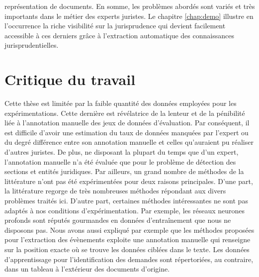 représentation de documents. En somme, les problèmes abordés sont variés et très importants dans le métier des experts juristes. Le chapitre \ref{chap:demo} illustre en l'occurrence la riche visibilité sur la jurisprudence qui devient facilement accessible à ces derniers grâce à l'extraction automatique des connaissances jurisprudentielles. 


\section{Critique du travail}
\label{sec:conclusion:critique}

Cette thèse est limitée par la faible quantité des données employées pour les expérimentations. Cette dernière est révélatrice de la lenteur et de la pénibilité liée à l'annotation manuelle des jeux de données d'évaluation. Par conséquent, il est difficile d'avoir une estimation du taux de données manquées par l'expert ou du degré différence entre son annotation manuelle et celles qu'auraient pu réaliser d'autres juristes. De plus, ne disposant la plupart du temps que d'un expert, l'annotation manuelle n'a été évaluée que pour le problème de détection des sections et entités juridiques. Par ailleurs, un grand nombre de méthodes de la littérature n'ont pas été expérimentées pour deux raisons principales. D'une part, la littérature regorge de très nombreuses méthodes répondant aux divers problèmes traités ici. D'autre part, certaines méthodes intéressantes ne sont pas adaptés à nos conditions d'expérimentation. Par exemple, les réseaux neurones profonds sont réputés gourmandes en données d'entraînement que nous ne disposons pas. Nous avons aussi expliqué par exemple que les méthodes proposées pour l'extraction des évènements exploite une annotation manuelle qui renseigne sur la position exacte où se trouve les données ciblées dans le texte. Les données d'apprentissage pour l'identification des demandes sont répertoriées, au contraire, dans un tableau à l'extérieur des documents d'origine.


